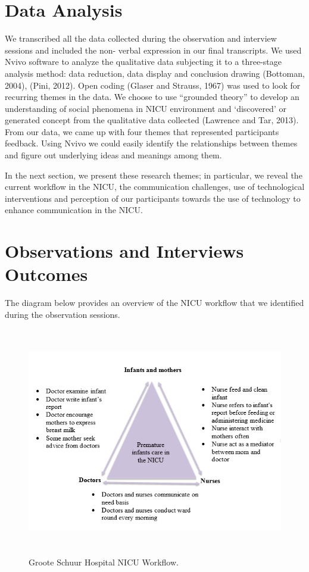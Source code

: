 \section{Data Analysis}
We transcribed all the data collected during the observation and interview sessions and included the non- verbal expression in our final transcripts. We used Nvivo software to analyze the qualitative data subjecting it to a three-stage analysis method: data reduction, data display and conclusion drawing (Bottoman, 2004), (Pini, 2012). Open coding (Glaser and Strauss, 1967) was used to look for recurring themes in the data. We choose to use “grounded theory” to develop an understanding of social phenomena in NICU environment and ‘discovered’ or generated concept from the qualitative data collected (Lawrence and Tar, 2013). From our data, we came up with four themes that represented participants feedback. Using Nvivo we could easily identify the relationships between themes and figure out underlying ideas and meanings among them.

In the next section, we present these research themes; in particular, we reveal the current workflow in the NICU, the communication challenges, use of technological interventions and  perception of our participants towards the use of technology to enhance communication in the NICU.

\section{Observations and Interviews Outcomes}
The diagram below provides an overview of the NICU workflow that we identified during the observation sessions.
\begin{figure}[htp]
    \centering
    \includegraphics[width=15cm, height=10cm]{Figures/workflow.PNG}
    \caption{Groote Schuur Hospital NICU Workflow.}
    \label{fig:workflow}
    \end{figure}

